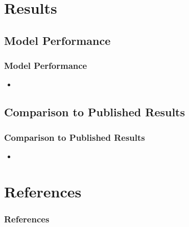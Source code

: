 \documentclass{beamer}
\begin{document}
\section{Results}

\subsection{Model Performance}
\begin{frame}
\frametitle{Model Performance}
\begin{itemize}
    \item
\end{itemize}
\end{frame}

\subsection{Comparison to Published Results}
\begin{frame}
\frametitle{Comparison to Published Results}
\begin{itemize}
    \item
\end{itemize}
\end{frame}

\section{References}

\begin{frame}[t]
\frametitle{References}
\printbibliography
\end{frame}
\end{document}
